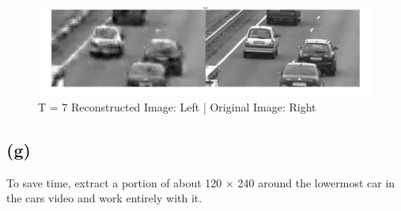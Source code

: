 \documentclass{article}
\begin{document}
\begin{figure}[!htb]
\begin{minipage}[!htb]{0.5\linewidth}
	\caption{$t = 6$}
	\includegraphics[scale=0.06]{t7/t7.jpg}
	\caption{$t = 7$}
\end{minipage}
\caption{T = 7  Reconstructed Image: Left | Original Image: Right}
\end{figure}

\newpage
\subsection{(g)}
To save time, extract a portion of about 120 × 240 around the lowermost car in the cars video and work entirely with it.
\end{document}
